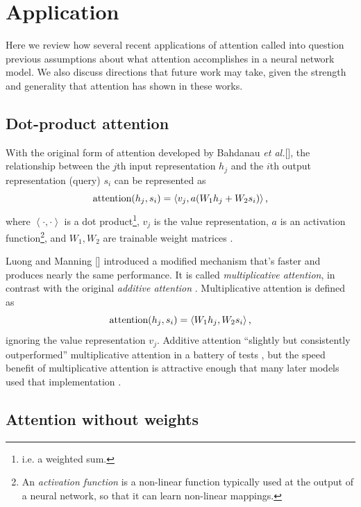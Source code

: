 \documentclass{article}
\newcommand{\etal}{\textit{et al.}}
\begin{document}
\section{Application}

Here we review how several recent applications of attention called into question previous assumptions about what attention accomplishes in a neural network model. We also discuss directions that future work may take, given the strength and generality that attention has shown in these works.

\subsection{Dot-product attention}

With the original form of attention developed by Bahdanau \etal [\citeyear{joint_align_translate}], the relationship between the $j$th input representation $h_j$ and the $i$th output representation (query) $s_i$ can be represented as
\[
\text{attention}(h_j,s_i)=\left<v_j,a(W_1h_j+W_2s_i)\right>\text,
\]
where $\left<\cdot,\cdot\right>$ is a dot product\footnote{i.e. a weighted sum.}, $v_j$ is the value representation, $a$ is an activation function\footnote{An \textit{activation function} is a non-linear function typically used at the output of a neural network, so that it can learn non-linear mappings.}, and $W_1,W_2$ are trainable weight matrices \cite{massive_exploration}.

Luong and Manning [\citeyear{multiplicative_attn}] introduced a modified mechanism that's faster and produces nearly the same performance. It is called \textit{multiplicative attention}, in contrast with the original \textit{additive attention} \cite{massive_exploration}. Multiplicative attention is defined as
\[
\text{attention}(h_j,s_i)=\left<W_1h_j,W_2s_i\right>\text,
\]
ignoring the value representation $v_j$. Additive attention ``slightly but consistently outperformed'' multiplicative attention in a battery of tests \cite{massive_exploration}, but the speed benefit of multiplicative attention is attractive enough that many later models used that implementation \cite{attn_all_you_need,more_multiplicative}.

\subsection{Attention without weights}\label{section:without_weights}
\end{document}
